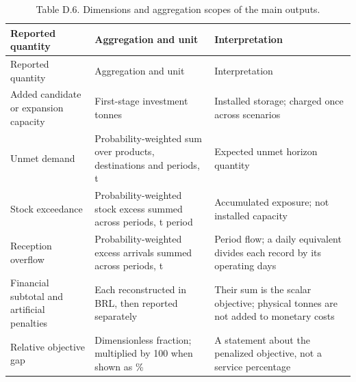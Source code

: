 \documentclass[
  english,
  11pt,
  a4paper,
]{article}
\begin{document}
\begin{longtable}[]{@{}
  >{\raggedright\arraybackslash}p{}
  >{\raggedright\arraybackslash}p{}
  >{\raggedright\arraybackslash}p{}@{}}
\caption{Table D.6. Dimensions and aggregation scopes of the main
outputs.}\tabularnewline
\toprule\noalign{}
\begin{minipage}[b]{\linewidth}\raggedright
Reported quantity
\end{minipage} & \begin{minipage}[b]{\linewidth}\raggedright
Aggregation and unit
\end{minipage} & \begin{minipage}[b]{\linewidth}\raggedright
Interpretation
\end{minipage} \\
\midrule\noalign{}
\endfirsthead
\toprule\noalign{}
\begin{minipage}[b]{\linewidth}\raggedright
Reported quantity
\end{minipage} & \begin{minipage}[b]{\linewidth}\raggedright
Aggregation and unit
\end{minipage} & \begin{minipage}[b]{\linewidth}\raggedright
Interpretation
\end{minipage} \\
\midrule\noalign{}
\endhead
\bottomrule\noalign{}
\endlastfoot
Added candidate or expansion capacity & First-stage investment tonnes &
Installed storage; charged once across scenarios \\
Unmet demand & Probability-weighted sum over products, destinations and
periods, t & Expected unmet horizon quantity \\
Stock exceedance & Probability-weighted stock excess summed across
periods, t period & Accumulated exposure; not installed capacity \\
Reception overflow & Probability-weighted excess arrivals summed across
periods, t & Period flow; a daily equivalent divides each record by its
operating days \\
Financial subtotal and artificial penalties & Each reconstructed in BRL,
then reported separately & Their sum is the scalar objective; physical
tonnes are not added to monetary costs \\
Relative objective gap & Dimensionless fraction; multiplied by 100 when
shown as \% & A statement about the penalized objective, not a service
percentage \\
\end{longtable}
\end{document}
